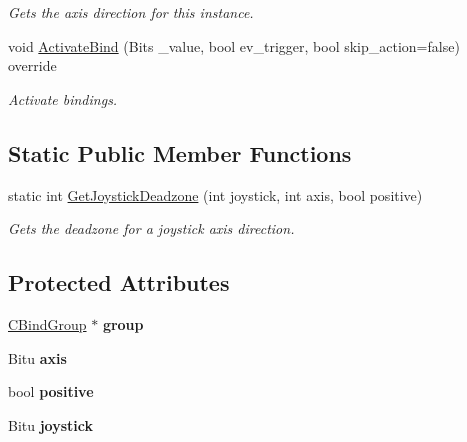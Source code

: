 \begin{DoxyCompactItemize}
\begin{DoxyCompactList}\small\item\em Gets the axis direction for this instance. \end{DoxyCompactList}\item 
\hypertarget{classCJAxisBind_a26d85b8903279b1948bcf9863d2a754b}{void \hyperlink{classCJAxisBind_a26d85b8903279b1948bcf9863d2a754b}{Activate\-Bind} (Bits \-\_\-value, bool ev\-\_\-trigger, bool skip\-\_\-action=false) override}\label{classCJAxisBind_a26d85b8903279b1948bcf9863d2a754b}

\begin{DoxyCompactList}\small\item\em Activate bindings. \end{DoxyCompactList}\end{DoxyCompactItemize}
\subsection*{Static Public Member Functions}
\begin{DoxyCompactItemize}
\item 
\hypertarget{classCJAxisBind_a43bdd7bf57954c208aea6e1a364d0a1e}{static int \hyperlink{classCJAxisBind_a43bdd7bf57954c208aea6e1a364d0a1e}{Get\-Joystick\-Deadzone} (int joystick, int axis, bool positive)}\label{classCJAxisBind_a43bdd7bf57954c208aea6e1a364d0a1e}

\begin{DoxyCompactList}\small\item\em Gets the deadzone for a joystick axis direction. \end{DoxyCompactList}\end{DoxyCompactItemize}
\subsection*{Protected Attributes}
\begin{DoxyCompactItemize}
\item 
\hypertarget{classCJAxisBind_a3aeea9f221c5a76fdf0658d5df006cac}{\hyperlink{classCBindGroup}{C\-Bind\-Group} $\ast$ {\bfseries group}}\label{classCJAxisBind_a3aeea9f221c5a76fdf0658d5df006cac}

\item 
\hypertarget{classCJAxisBind_a1845e3060cbcb2180e5a907dda6a7d4c}{Bitu {\bfseries axis}}\label{classCJAxisBind_a1845e3060cbcb2180e5a907dda6a7d4c}

\item 
\hypertarget{classCJAxisBind_a5c25cb696106b0959274368cd8dae0bd}{bool {\bfseries positive}}\label{classCJAxisBind_a5c25cb696106b0959274368cd8dae0bd}

\item 
\hypertarget{classCJAxisBind_ab47811ba5c358119d4e64855849f1a49}{Bitu {\bfseries joystick}}\label{classCJAxisBind_ab47811ba5c358119d4e64855849f1a49}

\end{DoxyCompactItemize}


